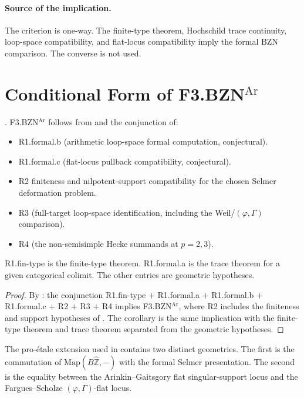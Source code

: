 \paragraph{Source of the implication.} The criterion
 is one-way.  The
finite-type theorem, Hochschild trace continuity, loop-space
compatibility, and flat-locus compatibility imply the formal BZN
comparison.  The converse is not used.

\section{Conditional Form of F3.BZN\(^{\mathrm{Ar}}\)}
\label{v4-arith:bzn-sub:consequence}

\begin{corollary}
\label{v4-arith:bzn-sub:cor:F3-BZN-closure-path}
\ClaimStatusNeedsVerification. F3.BZN\(^{\mathrm{Ar}}\) follows from
 and the conjunction of:
\begin{itemize}
\item R1.formal.b (arithmetic loop-space formal computation,
conjectural).
\item R1.formal.c (flat-locus pullback compatibility, conjectural).
\item R2 finiteness and nilpotent-support compatibility for the chosen
Selmer deformation problem.
\item R3 (full-target loop-space identification, including the
Weil/\((\varphi,\Gamma)\) comparison).
\item R4 (the non-semisimple Hecke summands at \(p=2,3\)).
\end{itemize}
R1.fin-type is the finite-type theorem. R1.formal.a is the trace
theorem for a given categorical colimit. The other entries are
geometric hypotheses.
\end{corollary}

\begin{proof}
By : the
conjunction R1.fin-type \(+\) R1.formal.a \(+\) R1.formal.b \(+\)
R1.formal.c \(+\) R2 \(+\) R3 \(+\) R4 implies F3.BZN\(^{\mathrm{Ar}}\),
where R2 includes the finiteness and support hypotheses of
. The corollary is the same
implication with the finite-type theorem and trace theorem separated
from the geometric hypotheses.
\end{proof}

\begin{remark}
\label{v4-arith:bzn-sub:rem:domain-delta}
The pro-\'etale extension used in
 contains two distinct
geometries.  The first is the commutation of
\(\mathrm{Map}(B\widehat{\mathbb Z},-)\) with the formal Selmer
presentation.  The second is the equality between the
Arinkin--Gaitsgory flat singular-support locus and the
Fargues--Scholze \((\varphi,\Gamma)\)-flat locus.
\end{remark}

